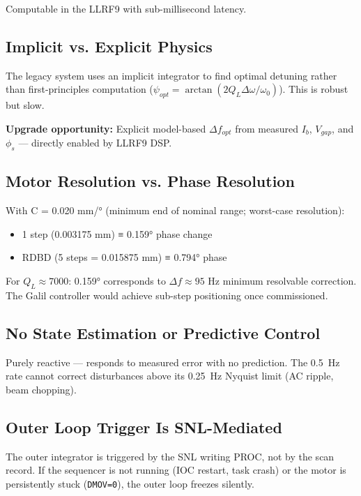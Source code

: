 Computable in the LLRF9 with sub-millisecond latency.

\subsection{Implicit vs. Explicit Physics}\label{sec:gap-implicit}


The legacy system uses an implicit integrator to find optimal detuning rather than first-principles computation (\(\psi_{opt} = \arctan(2Q_L \Delta\omega / \omega_0)\)). This is robust but slow.

\textbf{Upgrade opportunity:} Explicit model-based \(\Delta f_{opt}\) from measured \(I_b\), \(V_{gap}\), and \(\phi_s\) --- directly enabled by LLRF9 DSP.

\subsection{Motor Resolution vs. Phase Resolution}\label{sec:gap-resolution}


With C = 0.020 mm/° (minimum end of nominal range; worst-case resolution):

\begin{itemize}
\tightlist
\item
  1 step (0.003175 mm) ≡ 0.159° phase change
\item
  RDBD (5 steps = 0.015875 mm) ≡ 0.794° phase
\end{itemize}

For \(Q_L \approx 7000\): 0.159° corresponds to \(\Delta f \approx 95\) Hz minimum resolvable correction. The Galil controller would achieve sub-step positioning once commissioned.

\subsection{No State Estimation or Predictive Control}\label{sec:gap-estimation}


Purely reactive --- responds to measured error with no prediction. The \qty{0.5}{\hertz} rate cannot correct disturbances above its \qty{0.25}{\hertz} Nyquist limit (AC ripple, beam chopping).

\subsection{Outer Loop Trigger Is SNL-Mediated}\label{sec:gap-trigger}


The outer integrator is triggered by the SNL writing PROC, not by the scan record. If the sequencer is not running (IOC restart, task crash) or the motor is persistently stuck (\texttt{DMOV=0}), the outer loop freezes silently.

